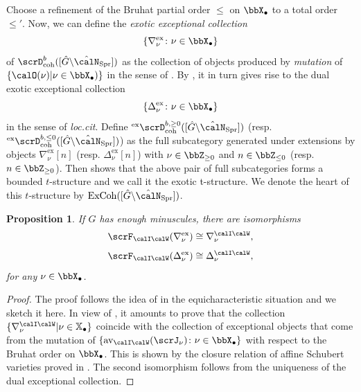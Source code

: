 \documentclass[10pt, reqno]{amsart}
\theoremstyle{plain}
\newtheorem{proposition}[theorem]{Proposition}
\theoremstyle{definition}
\numberwithin{equation}{section}
\begin{document}
Choose a refinement of the Bruhat partial order $\leq$ on $\bbX_{\bullet}$ to a total order $\leq'$. Now, we can define the \textit{exotic exceptional collection} 
\begin{equation}
	\{\nabla^\mathrm{ex}_\nu\colon \nu\in \bbX_{\bullet}\}
\end{equation}
of $\scrD^b_\mathrm{coh}([\hat{G}\backslash \hat{\calN}_{\mathrm{Spr}}])$ as the collection of objects produced by \textit{mutation} of $\{\calO(\nu)\vert \nu\in\bbX_{\bullet})\}$ in the sense of \cite[Section 7.1.2]{AR}. By \cite[Proposition 3]{Bez06}, it in turn gives rise to the dual exotic exceptional collection 
\begin{equation}
	\{\Delta_\nu^\mathrm{ex}\colon \nu\in \bbX_{\bullet}\}
\end{equation}
in the sense of \textit{loc.cit}. 
Define $^{\mathrm{ex}}\scrD_\mathrm{coh}^{b,\geq 0}([\hat{G}\backslash \hat{\calN}_{\mathrm{Spr}}])$ (resp. $^{\mathrm{ex}}\scrD_\mathrm{coh}^{b,\leq 0}([\hat{G}\backslash \hat{\calN}_{\mathrm{Spr}}])$) as the full subcategory generated under extensions by objects $\nabla_\nu^\mathrm{ex}[n]$ (resp. $\Delta_\nu^\mathrm{ex}[n]$) with $\nu\in \bbZ_{\geq 0}$ and $n\in \bbZ_{\leq 0}$ (resp. $n\in \bbZ_{\geq 0}$). Then \cite[Proposition 4]{Bez06} shows that the above pair of full subcategories forms a bounded $t$-structure and we call it the {exotic t-structure}. We denote the heart of this $t$-structure by $\mathrm{ExCoh}([\hat{G}\backslash\hat{\calN}_{\mathrm{Spr}}])$.
\begin{proposition} \label{prop_F_IW_is_t_exact}
	If $G$ has enough minuscules, there are isomorphisms
	\begin{equation}
		\scrF_{\calI\calW}(\nabla_\nu^\mathrm{ex})\cong \nabla_\nu^{\calI\calW},
	\end{equation}
	\begin{equation}
		\scrF_{\calI\calW}(\Delta_\nu^\mathrm{ex})\cong \Delta_\nu^{\calI\calW},
	\end{equation}for any $\nu\in \bbX_{\bullet}$.
\end{proposition}

\begin{proof}
	The proof follows the idea of \cite[Proposition 7.1.5]{AR}  in the equicharacteristic situation and we sketch it here. In view of , it amounts to prove that the collection $\{\nabla^{\calI\calW}_\nu \vert \nu\in \mathbb{X}_\bullet\}$ coincide with the collection of exceptional objects that come from the mutation of $\{\mathrm{av}_{\calI\calW}(\scrJ_\nu)\colon\nu\in \bbX_\bullet\}$ with respect to the Bruhat order on $\bbX_\bullet$. This is shown by the closure relation of affine Schubert varieties proved in . The second isomorphism follows from the uniqueness of the dual exceptional collection.		
\end{proof}
\end{document}
